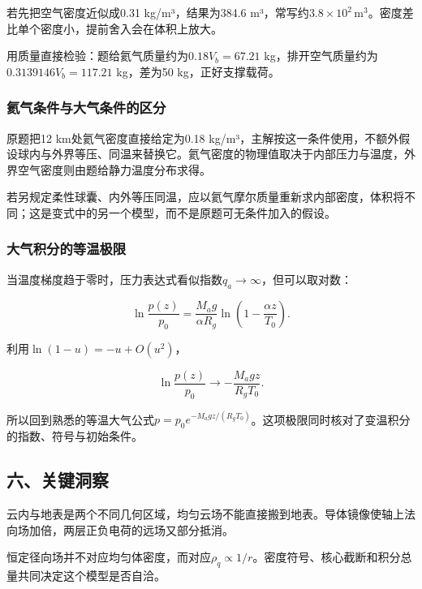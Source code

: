 \documentclass[12pt,a4paper,fontset=fandol]{ctexart}
\begin{document}
若先把空气密度近似成0.31 kg/m³，结果为384.6
m³，常写约\(3.8\times10^2\,\mathrm{m^3}\)。密度差比单个密度小，提前舍入会在体积上放大。

用质量直接检验：题给氦气质量约为\(0.18V_b=67.21\)
kg，排开空气质量约为\(0.3139146V_b=117.21\) kg，差为50
kg，正好支撑载荷。

\subsubsection{氦气条件与大气条件的区分}\label{ux6c26ux6c14ux6761ux4ef6ux4e0eux5927ux6c14ux6761ux4ef6ux7684ux533aux5206}

原题把12 km处氦气密度直接给定为0.18
kg/m³，主解按这一条件使用，不额外假设球内与外界等压、同温来替换它。氦气密度的物理值取决于内部压力与温度，外界空气密度则由题给静力温度分布求得。

若另规定柔性球囊、内外等压同温，应以氦气摩尔质量重新求内部密度，体积将不同；这是变式中的另一个模型，而不是原题可无条件加入的假设。

\par\noindent\begin{minipage}{\linewidth}
\subsubsection{大气积分的等温极限}\label{ux5927ux6c14ux79efux5206ux7684ux7b49ux6e29ux6781ux9650}

当温度梯度趋于零时，压力表达式看似指数\(q_a\to\infty\)，但可以取对数：

\[
\ln\frac{p(z)}{p_0}
=\frac{M_ag}{\alpha R_g}
\ln\left(1-\frac{\alpha z}{T_0}\right).
\]

利用\(\ln(1-u)=-u+O(u^2)\)，

\[
\ln\frac{p(z)}{p_0}\longrightarrow
-\frac{M_agz}{R_gT_0}.
\]

所以回到熟悉的等温大气公式\(p=p_0e^{-M_agz/(R_gT_0)}\)。这项极限同时核对了变温积分的指数、符号与初始条件。

\end{minipage}\par
\subsection{六、关键洞察}\label{ux516dux5173ux952eux6d1eux5bdf-6}

云内与地表是两个不同几何区域，均匀云场不能直接搬到地表。导体镜像使轴上法向场加倍，两层正负电荷的远场又部分抵消。

恒定径向场并不对应均匀体密度，而对应\(\rho_q\propto1/r\)。密度符号、核心截断和积分总量共同决定这个模型是否自洽。
\end{document}
